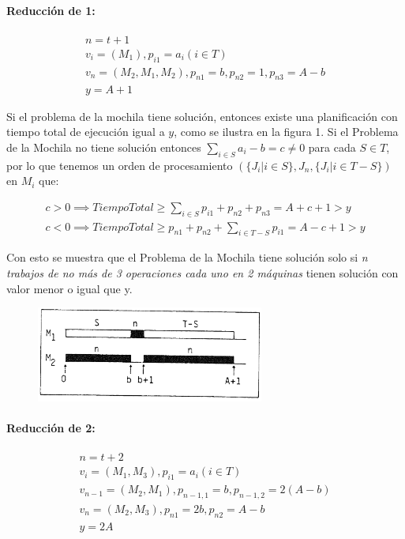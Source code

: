 \documentclass[11pt, a4paper,spanish]{article}
\begin{document}
				\paragraph{Reducción de 1:}
				
					\begin{gather}
						n = t+1 \\
						v_{i} = (M_{1}), p_{i1} = a_{i} (i \in T) \\
						v_{n} = (M_{2}, M_{1}, M_{2}), p_{n1} = b,  p_{n2} = 1,  p_{n3} = A-b \\
						y = A +1
					\end{gather}
			
					Si el problema de la mochila tiene solución, entonces existe una planificación con tiempo total de ejecución igual a $y$, como se ilustra en la figura 1. Si el Problema de la Mochila no tiene solución entonces  $\sum_{i\in S}a_{i} - b = c \neq 0$ para cada  $S \in T$, por lo que tenemos un orden de procesamiento $( \{J_{i} | i \in S\},J_{n} , \{J_{i} | i \in T-S\})$ en $M_{i}$ que:

					\begin{gather}
						c > 0 \implies  TiempoTotal \geq \sum_{i\in S}p_{i1} + p_{n2} + p_{n3} = A + c + 1 > y\\ 
						c < 0 \implies  TiempoTotal \geq  p_{n1} + p_{n2}  + \sum_{i\in T-S}p_{i1} = A - c + 1 > y
					\end{gather}
					
					Con esto se muestra que el Problema de la Mochila tiene solución solo si \textit{ n trabajos de no más de 3 operaciones cada uno en 2 máquinas} tienen solución con valor menor o igual que y.
	
					\begin{figure}[H]
						\centering
						\includegraphics[width=75mm]{res/example1.png}
					\end{figure}
	
				\paragraph{Reducción de 2:}

					\begin{gather}
						n = t + 2 \\
						v_{i} = (M_{1}, M_{3}), p_{i1} = a_{i} (i \in T) \\
						v_{n-1} = (M_{2}, M_{1}), p_{n-1,1} = b,  p_{n-1,2} = 2(A-b) \\
						v_{n} = (M_{2}, M_{3}), p_{n1} = 2b,  p_{n2} = A-b \\
						y = 2A
					\end{gather}
					
\end{document}
